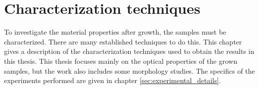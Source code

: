 
\chapter{Characterization techniques}
\label{sec:characterization}
To investigate the material properties after growth, the samples must be characterized. There are many established techniques to do this. This chapter gives a description of the characterization techniques used to obtain the results in this thesis. This thesis focuses mainly on the optical properties of the grown samples, but the work also includes some morphology studies. The specifics of the experiments performed are given in chapter \ref{sec:experimental_details}.





